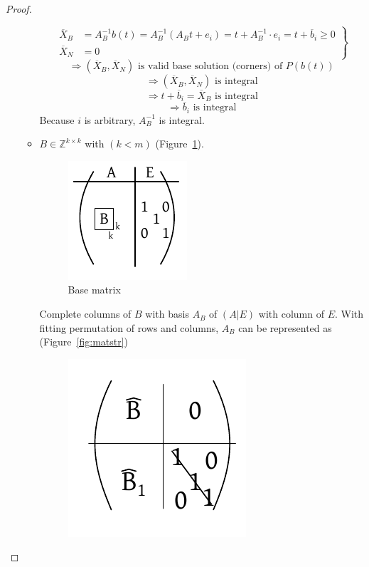 \documentclass{article}
\begin{document}
\begin{proof}
\begin{itemize}
\begin{itemize}
          \[
            \left.\begin{array}{ll}
              \overline{X}_B &= A_B^{-1} b(t) = A_B^{-1} (A_B t + e_i) = t + A_B^{-1} \cdot e_i = t + \overline{b}_i \geq 0 \\
              \overline{X}_N &= 0
            \end{array}\right\}
          \] %
          \[ \Rightarrow (\overline{X}_B, \overline{X}_N) \text{ is valid base solution (corners) of } P(b(t)) \]
          \[ \Rightarrow (\overline{X}_B, \overline{X}_N) \text{ is integral} \]
          \[ \Rightarrow t + \overline{b}_i = \overline{X}_B \text{ is integral} \]
          \[ \Rightarrow \overline{b}_i \text{ is integral} \]
          Because $i$ is arbitrary, $A_B^{-1}$ is integral.
        \item
          $B \in \mathbb{Z}^{k \times k}$ with $(k < m)$ (Figure~\ref{fig:basematr}).
          \begin{figure}[!ht]
            \begin{center}
              \includegraphics{img/basematrix.pdf}
              \caption{Base matrix}
              \label{fig:basematr}
            \end{center}
          \end{figure}
          Complete columns of $B$ with basis $A_B$ of $(A | E)$ with column of $E$.
          With fitting permutation of rows and columns, $A_B$ can be represented as (Figure~\ref{fig:matstr})
          \begin{figure}[!ht]
            \begin{center}
              \includegraphics{img/matrix_structure.pdf}

\end{center}
\end{figure}
\end{itemize}
\end{itemize}
\end{proof}
\end{document}
